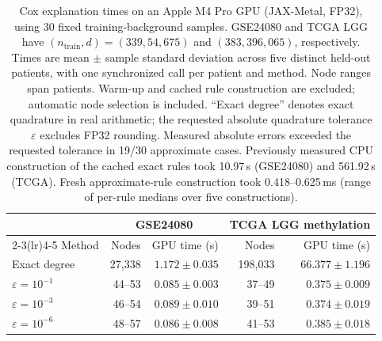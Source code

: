 \begin{table}[t]
\centering
\small
\setlength{\tabcolsep}{5pt}
\begin{tabular}{lrrrr}
\toprule
 & \multicolumn{2}{c}{GSE24080} & \multicolumn{2}{c}{TCGA LGG methylation} \\
\cmidrule(lr){2-3}\cmidrule(lr){4-5}
Method & Nodes & GPU time (s) & Nodes & GPU time (s) \\
\midrule
Exact degree & 27,338 & $1.172 \pm 0.035$ & 198,033 & $66.377 \pm 1.196$ \\
$\varepsilon=10^{-1}$ & 44--53 & $0.085 \pm 0.003$ & 37--49 & $0.375 \pm 0.009$ \\
$\varepsilon=10^{-3}$ & 46--54 & $0.089 \pm 0.010$ & 39--51 & $0.374 \pm 0.019$ \\
$\varepsilon=10^{-6}$ & 48--57 & $0.086 \pm 0.008$ & 41--53 & $0.385 \pm 0.018$ \\
\bottomrule
\end{tabular}
\caption{Cox explanation times on an Apple M4 Pro GPU (JAX-Metal, FP32),
using 30 fixed training-background samples. GSE24080 and TCGA LGG have
$(n_{\mathrm{train}},d)=(339,54{,}675)$ and $(383,396{,}065)$, respectively.
Times are mean $\pm$ sample standard deviation across five distinct held-out
patients, with one synchronized call per patient and method. Node ranges span
patients. Warm-up and cached rule construction are excluded; automatic node
selection is included. ``Exact degree'' denotes exact quadrature in real
arithmetic; the requested absolute quadrature tolerance $\varepsilon$ excludes FP32 rounding.
Measured absolute errors exceeded the requested tolerance in 19/30 approximate cases.
Previously measured CPU construction of the cached exact rules took
10.97\,s (GSE24080) and 561.92\,s (TCGA).
Fresh approximate-rule construction took 0.418--0.625\,ms
(range of per-rule medians over five constructions).}
\label{tab:cox-gpu-background30}
\end{table}
